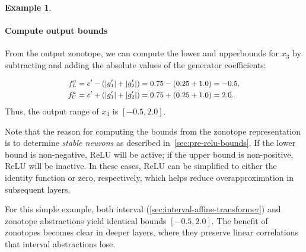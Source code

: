 \documentclass[oneside,11pt,dvipsnames]{book}
\numberwithin{equation}{section}
\theoremstyle{definition}
\newtheorem{example}{Example}[section]
\theoremstyle{remark}
\begin{document}
\begin{example}
\paragraph{Compute output bounds} From the output zonotope, we can compute the lower and upperbounds for \(x_3\) by subtracting and adding the absolute values of the generator coefficients:

\begin{equation}
    \small
\begin{aligned}
f^a_L &= c' - (|g'_1| + |g'_2|) = 0.75 - (0.25 + 1.0) = -0.5, \\
f^a_U &= c' + (|g'_1| + |g'_2|) = 0.75 + (0.25 + 1.0) = 2.0.
\end{aligned}
\end{equation}
Thus, the output range of $x_3$ is \([-0.5, 2.0]\).


Note that the reason for computing the bounds from the zonotope representation is to determine \emph{stable neurons} as described in~\autoref{sec:pre-relu-bounds}. If the lower bound is non-negative, ReLU will be active; if the upper bound is non-positive,  ReLU will be inactive. In these cases, ReLU can be simplified to either the identity function or zero, respectively, which helps reduce overapproximation in subsequent layers.

For this simple example, both interval (\autoref{sec:interval-affine-transformer}) and zonotope abstractions yield identical bounds \([-0.5, 2.0]\).
The benefit of zonotopes becomes clear in deeper layers, where they preserve linear correlations that interval abstractions lose.
\end{example}
\end{document}
